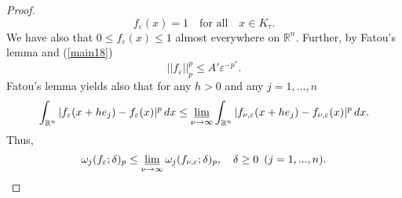 \documentclass[12pt,twoside,reqno]{amsart}
\numberwithin{equation}{section}
\theoremstyle{definition}
\numberwithin{equation}{section}
\begin{document}
\begin{proof}
\begin{equation}\label{main20}
 f_{\varepsilon}(x)=1 \quad \mbox{for  all}\quad x\in K_\tau.
\end{equation}
We have also that $0\le f_{\varepsilon}(x)\le 1$ almost everywhere on ${\mathbb{R}}^n.$
Further, by Fatou's lemma and (\ref{main18})
\begin{equation}\label{main1000}
||f_{\varepsilon}||_p^p\le A'{\varepsilon}^{-p^*}.
\end{equation}
 Fatou's lemma yields also that
for any $h>0$ and any $j=1,...,n$
$$
\int_{{\mathbb{R}}^n}|f_{\varepsilon}(x+he_j)-f_{\varepsilon}(x)|^p\,dx\le \varliminf_{\nu\to \infty}\int_{{\mathbb{R}}^n}|f_{\nu,{\varepsilon}}(x+he_j)-f_{\nu,{\varepsilon}}(x)|^p\,dx.
$$
Thus,
\begin{equation}\label{main21}
{\omega}_j(f_{\varepsilon};{\delta})_p\le \varliminf_{\nu\to \infty}{\omega}_j(f_{\nu,{\varepsilon}};{\delta})_p, \quad {\delta}\ge 0\,\,\,(j=1,...,n).
\end{equation}


\end{proof}
\end{document}
